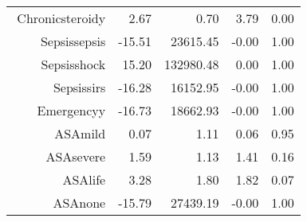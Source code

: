 \begin{tabular}{rrrrr}
$$  Chronic\-steroid\-y & 2.67 & 0.70 & 3.79 & 0.00 \\ 
  Sepsis\-sepsis & -15.51 & 23615.45 & -0.00 & 1.00 \\ 
  Sepsis\-shock & 15.20 & 132980.48 & 0.00 & 1.00 \\ 
  Sepsis\-sirs & -16.28 & 16152.95 & -0.00 & 1.00 \\ 
  Emergency\-y & -16.73 & 18662.93 & -0.00 & 1.00 \\ 
  ASA\-mild & 0.07 & 1.11 & 0.06 & 0.95 \\ 
  ASA\-severe & 1.59 & 1.13 & 1.41 & 0.16 \\ 
  ASA\-life & 3.28 & 1.80 & 1.82 & 0.07 \\ 
  ASA\-none & -15.79 & 27439.19 & -0.00 & 1.00 \\ 
   \hline
\end{tabular}

